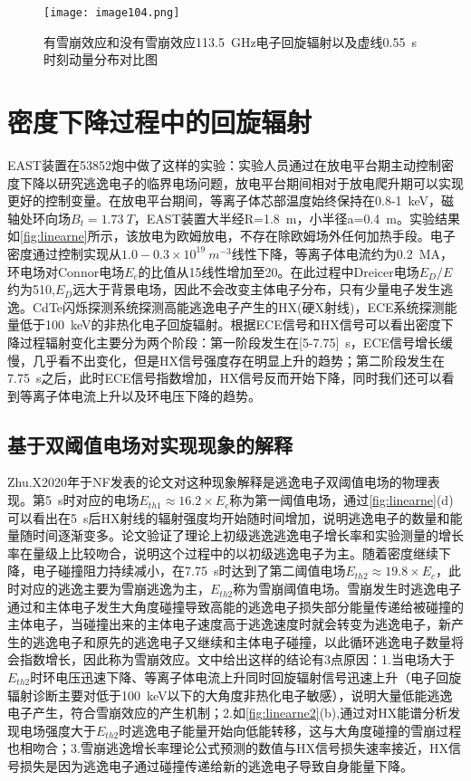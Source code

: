 \begin{figure}
\centering
\texttt{[image: image104.png]}
\caption{\label{fig:peakece4}有雪崩效应和没有雪崩效应113.5~GHz电子回旋辐射以及虚线0.55~s时刻动量分布对比图}
\end{figure}

\section{密度下降过程中的回旋辐射}\label{sec:exp_ece}

EAST装置在53852炮中做了这样的实验：实验人员通过在放电平台期主动控制密度下降以研究逃逸电子的临界电场问题，放电平台期间相对于放电爬升期可以实现更好的控制变量。在放电平台期间，等离子体芯部温度始终保持在0.8-1~keV，磁轴处环向场$B_t=1.73~T$，EAST装置大半经R=1.8~m，小半径a=0.4~m。实验结果如\autoref{fig:linearne}所示，该放电为欧姆放电，不存在除欧姆场外任何加热手段。电子密度通过控制实现从$1.0-0.3×10^{19} ~m^{-3}$线性下降，等离子体电流约为0.2~MA，环电场对Connor电场$E_c$的比值从15线性增加至20。在此过程中Dreicer电场$E_D/E$约为510,$E_D$远大于背景电场，因此不会改变主体电子分布，只有少量电子发生逃逸。CdTe闪烁探测系统探测高能逃逸电子产生的HX(硬X射线)，ECE系统探测能量低于100~keV的非热化电子回旋辐射。根据ECE信号和HX信号可以看出密度下降过程辐射变化主要分为两个阶段：第一阶段发生在[5-7.75]~s，ECE信号增长缓慢，几乎看不出变化，但是HX信号强度存在明显上升的趋势；第二阶段发生在7.75~s之后，此时ECE信号指数增加，HX信号反而开始下降，同时我们还可以看到等离子体电流上升以及环电压下降的趋势。
\subsection{基于双阈值电场对实现现象的解释}\label{sec:no_growth}
Zhu.X2020年于NF发表的论文\cite{RN960}对这种现象解释是逃逸电子双阈值电场的物理表现。第5~s时对应的电场$E_{th1}≈16.2×E_c$称为第一阈值电场，通过\autoref{fig:linearne}(d)可以看出在5~s后HX射线的辐射强度均开始随时间增加，说明逃逸电子的数量和能量随时间逐渐变多。论文验证了理论上初级逃逸逃逸电子增长率和实验测量的增长率在量级上比较吻合，说明这个过程中的以初级逃逸电子为主。随着密度继续下降，电子碰撞阻力持续减小，在7.75~s时达到了第二阈值电场$E_{th2}≈19.8×E_c$，此时对应的逃逸主要为雪崩逃逸为主，$E_{th2}$称为雪崩阈值电场。雪崩发生时逃逸电子通过和主体电子发生大角度碰撞导致高能的逃逸电子损失部分能量传递给被碰撞的主体电子，当碰撞出来的主体电子速度高于逃逸速度时就会转变为逃逸电子，新产生的逃逸电子和原先的逃逸电子又继续和主体电子碰撞，以此循环逃逸电子数量将会指数增长，因此称为雪崩效应。文中给出这样的结论有3点原因：1.当电场大于$E_{th2}$时环电压迅速下降、等离子体电流上升同时回旋辐射信号迅速上升（电子回旋辐射诊断主要对低于100~keV以下的大角度非热化电子敏感），说明大量低能逃逸电子产生，符合雪崩效应的产生机制；2.如\autoref{fig:linearne2}(b),通过对HX能谱分析发现电场强度大于$E_{th2}$时逃逸电子能量开始向低能转移，这与大角度碰撞的雪崩过程也相吻合；3.雪崩逃逸增长率理论公式预测的数值与HX信号损失速率接近，HX信号损失是因为逃逸电子通过碰撞传递给新的逃逸电子导致自身能量下降。

